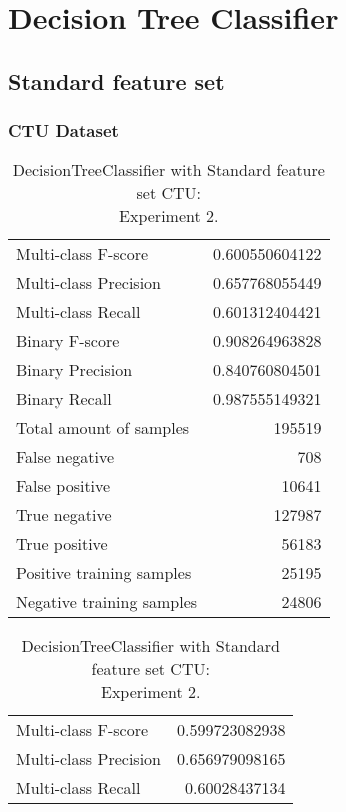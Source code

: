 
\chapter{Decision Tree Classifier} %

\section{Standard feature set}
\subsection{CTU Dataset}

\begin{table}[H]
\begin{minipage}{0.5\textwidth}
\caption{DecisionTreeClassifier with Standard feature set CTU: \\Experiment 1.}
\centering
\begin{tabular}{l r}
\toprule
Multi-class F-score & 0.600550604122 \\
Multi-class Precision & 0.657768055449 \\
Multi-class Recall & 0.601312404421 \\
\midrule
Binary F-score & 0.908264963828 \\
Binary Precision & 0.840760804501 \\
Binary Recall & 0.987555149321 \\
\midrule
Total amount of samples & 195519 \\
False negative & 708 \\
False positive & 10641 \\
True negative & 127987 \\
True positive & 56183 \\
\midrule
Positive training samples & 25195 \\
Negative training samples & 24806 \\
\bottomrule
\end{tabular}
\end{minipage}
\hfillx
\begin{minipage}{0.5\textwidth}
\caption{DecisionTreeClassifier with Standard feature set CTU: \\Experiment 2.}
\centering
\begin{tabular}{l r}
\toprule
Multi-class F-score & 0.599723082938 \\
Multi-class Precision & 0.656979098165 \\
Multi-class Recall & 0.60028437134 \\

\end{tabular}
\end{minipage}
\end{table}

